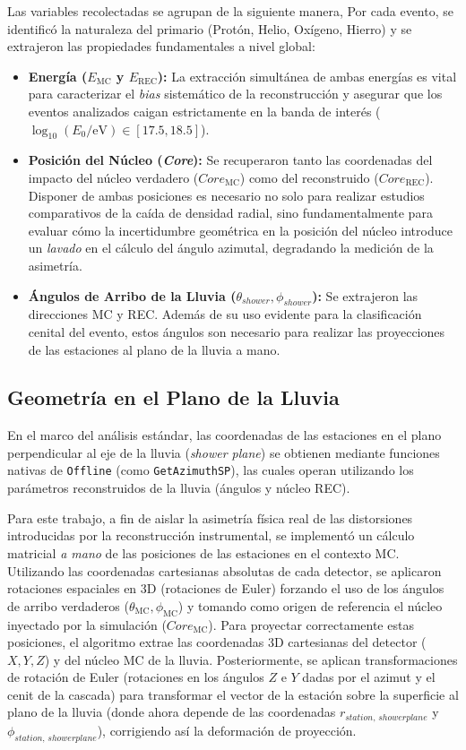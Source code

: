Las variables recolectadas se agrupan de la siguiente manera, Por cada evento, se identificó la naturaleza del primario (Protón, Helio, Oxígeno, Hierro) y se extrajeron las propiedades fundamentales a nivel global:
\begin{itemize}
	\item \textbf{Energía ($E_{\mathrm{MC}}$ y $E_{\mathrm{REC}}$):} La extracción simultánea de ambas energías es vital para caracterizar el \textit{bias} sistemático de la reconstrucción y asegurar que los eventos analizados caigan estrictamente en la banda de interés ($\log_{10}(E_0/\mathrm{eV}) \in [17.5, 18.5]$).
	\item \textbf{Posición del Núcleo (\textit{Core}):} Se recuperaron tanto las coordenadas del impacto del núcleo verdadero ($Core_{\mathrm{MC}}$) como del reconstruido ($Core_{\mathrm{REC}}$). Disponer de ambas posiciones es necesario no solo para realizar estudios comparativos de la caída de densidad radial, sino fundamentalmente para evaluar cómo la incertidumbre geométrica en la posición del núcleo introduce un \textit{lavado} en el cálculo del ángulo azimutal, degradando la medición de la asimetría.
	\item \textbf{Ángulos de Arribo de la Lluvia ($\theta_{shower}, \phi_{shower}$):} Se extrajeron las direcciones MC y REC. Además de su uso evidente para la clasificación cenital del evento, estos ángulos son necesario para realizar las proyecciones de las estaciones al plano de la lluvia a mano.
\end{itemize}

\subsection{Geometría en el Plano de la Lluvia}
\label{sec:calculo_manual_geometria}

En el marco del análisis estándar, las coordenadas de las estaciones en el plano perpendicular al eje de la lluvia (\textit{shower plane}) se obtienen mediante funciones nativas de \texttt{Offline} (como \texttt{GetAzimuthSP}), las cuales operan utilizando los parámetros reconstruidos de la lluvia (ángulos y núcleo REC).

Para este trabajo, a fin de aislar la asimetría física real de las distorsiones introducidas por la reconstrucción instrumental, se implementó un cálculo matricial \textit{a mano} de las posiciones de las estaciones en el contexto MC. Utilizando las coordenadas cartesianas absolutas de cada detector, se aplicaron rotaciones espaciales en 3D (rotaciones de Euler) forzando el uso de los ángulos de arribo verdaderos ($\theta_{\mathrm{MC}}, \phi_{\mathrm{MC}}$) y tomando como origen de referencia el núcleo inyectado por la simulación ($Core_{\mathrm{MC}}$). Para proyectar correctamente estas posiciones, el algoritmo extrae las coordenadas 3D cartesianas del detector ($X, Y, Z$) y del núcleo MC de la lluvia. Posteriormente, se aplican transformaciones de rotación de Euler (rotaciones en los ángulos $Z$ e $Y$ dadas por el azimut y el cenit de la cascada) para transformar el vector de la estación sobre la superficie al plano de la lluvia (donde ahora depende de las coordenadas $r_{station, \,  showerplane}$ y $\phi_{station, \, showerplane}$), corrigiendo así la deformación de proyección.

